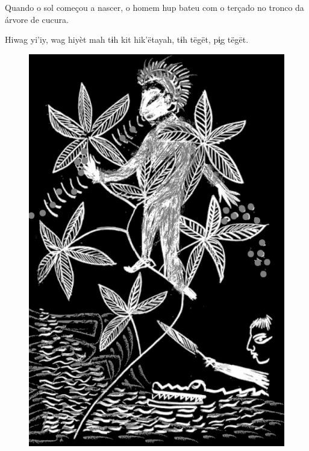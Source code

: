 \chapter*{}

\mbox{}\vspace*{\fill}

Quando o sol
começou a nascer,
o homem hup bateu
com o terçado no
tronco da árvore
de cucura.

\bigskip

Hiwag yi’iy, wag
hiyèt mah tɨh kit
hik’ëtayah, tɨh
tëgët, pɨ̗g tëgët.

\vspace*{\fill}

\begin{figure}
\vspace*{-1.2cm}
\hspace*{-2.2cm}\includegraphics[width=138mm]{./imgs/img5.jpg}
\end{figure}

